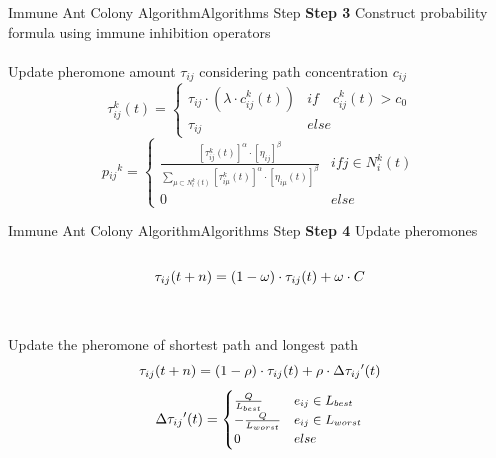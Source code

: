 \begin{frame}{Immune Ant Colony Algorithm}{Algorithms Step}
\large \textbf{Step 3} \normalsize {Construct probability formula using immune inhibition operators}\\~\\
\centering \small {Update pheromone amount $\tau_{ij}$ considering path concentration $c_{ij}$}
\begin{equation}
\tau_{ij}^k(t)=
\begin{cases}
\tau_{ij} \cdot \left(\lambda \cdot c_{ij}^k(t)\right) & if \quad c_{ij}^k(t) > c_0 \\
\tau_{ij} & else
\end{cases}
\end{equation}
\begin{equation}
p{_{ij}}^{k} =
\begin{cases}
\frac{[\tau_{ij}^k(t)]^\alpha \cdot [\eta_{ij}]^\beta} { \sum\limits_{\mu \subset N^k_l(t)} [\tau_{i\mu}^k(t)]^\alpha \cdot [\eta_{i\mu}(t)]^\beta} & if j \in N^k_i(t) \\
0 & else
\end{cases}
\end{equation}
\end{frame}

\begin{frame}{Immune Ant Colony Algorithm}{Algorithms Step}
\large \textbf{Step 4} \normalsize {Update pheromones}\\~\\
\begin{equation} \small{
\tau_{ij}(t+n) = (1-\omega)\cdot\tau_{ij}(t)+\omega\cdot C}
\end{equation} \\~\\
\centering \small {Update the pheromone of shortest path and longest path}
\begin{equation}\small{
\tau_{ij}(t+n) = (1-\rho)\cdot\tau_{ij}(t)+\rho\cdot \Delta{\tau_{ij}}'(t)}
\end{equation}
\begin{equation} \small{
\Delta{\tau_{ij}}'(t) = 
\begin{cases}
\frac{Q}{L_{best}} & e_{ij} \in L_{best} \\
-\frac{Q}{L_{worst}} & e_{ij} \in L_{worst} \\
0 & else
\end{cases}}
\end{equation}
\end{frame}

